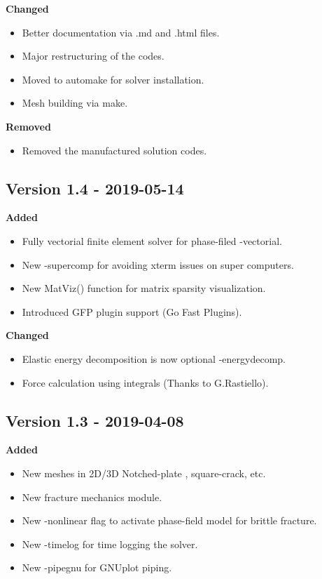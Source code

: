\documentclass{report}
\begin{document}
\textbf{Changed}
\begin{itemize}
 \item Better documentation via {\ttfamily.md} and {\ttfamily.html} files.
 \item Major restructuring of the codes. 
 \item Moved to {\ttfamily automake} for solver installation.
 \item Mesh building via {\ttfamily make}.
\end{itemize}

\textbf{Removed}
\begin{itemize}
 \item Removed the manufactured solution codes.
\end{itemize}

\subsection{Version 1.4 - 2019-05-14}

\textbf{Added}
\begin{itemize}
 \item Fully vectorial finite element solver for phase-filed {\ttfamily-vectorial}.
 \item New {\ttfamily-supercomp} for avoiding xterm issues on super computers.
 \item New {\ttfamily MatViz()} function for matrix sparsity visualization.
 \item Introduced  {\ttfamily GFP} plugin support (Go Fast Plugins). 
\end{itemize}

\textbf{Changed}
\begin{itemize}
 \item Elastic energy decomposition is now optional {\ttfamily -energydecomp}.
 \item Force calculation using integrals (Thanks to G.Rastiello).
\end{itemize}

\subsection{Version 1.3 - 2019-04-08}

\textbf{Added}
\begin{itemize}
 \item New meshes in 2D/3D {\ttfamily Notched-plate} , {\ttfamily square-crack}, etc.
 \item New fracture mechanics module.
 \item New {\ttfamily -nonlinear} flag to activate phase-field model for brittle fracture.
 \item New {\ttfamily -timelog} for time logging the solver.
 \item New {\ttfamily -pipegnu} for GNUplot piping.
\end{itemize}
\end{document}
